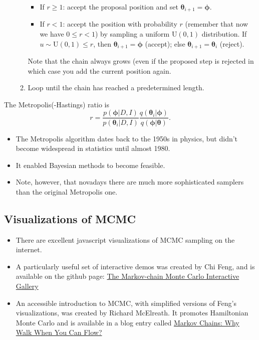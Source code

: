 \documentclass[%
oneside,                 %
final,                   %
10pt]{article}
\begin{document}
\begin{enumerate}
\begin{enumerate}
\begin{itemize}
    \item If $r \geq 1$: accept the proposal position and set $\boldsymbol{\theta}_{i+1} = \boldsymbol{\phi}$.

    \item If $r < 1$: accept the position with probability $r$ (remember that now we have $0 \leq r < 1$) by sampling a uniform $\mathrm{U}(0,1)$ distribution. If $u \sim \mathrm{U}(0,1) \leq r$, then $\boldsymbol{\theta}_{i+1} = \boldsymbol{\phi}$ (accept); else $\boldsymbol{\theta}_{i+1} = \boldsymbol{\theta}_i$ (reject).
\end{itemize}

\noindent
    Note that the chain always grows (even if the proposed step is rejected in which case you add the current position again.

 \item Loop until the chain has reached a predetermined length.
\end{enumerate}

\noindent
\end{enumerate}

\noindent
The Metropolis(-Hastings) ratio is
    \[
    r = \frac{p( \boldsymbol{\phi} | D,I)}{p( \boldsymbol{\theta}_i | D,I)}
    \frac{q( \boldsymbol{\theta}_i | \boldsymbol{\phi} )}{q( \boldsymbol{\phi} | \boldsymbol{\theta} )}.
    \]

\begin{itemize}
\item The Metropolis algorithm dates back to the 1950s in physics, but didn't become widespread in statistics until almost 1980.

\item It enabled Bayesian methods to become feasible.

\item Note, however, that novadays there are much more sophisticated samplers than the original Metropolis one.
\end{itemize}

\noindent
\subsection{Visualizations of MCMC}
\begin{itemize}
\item There are excellent javascript visualizations of MCMC sampling on the internet.

\item A particularly useful set of interactive demos was created by Chi Feng, and is available on the github page: \href{{https://chi-feng.github.io/mcmc-demo/}}{The Markov-chain Monte Carlo Interactive Gallery}

\item An accessible introduction to MCMC, with simplified versions of Feng's visualizations, was created by Richard McElreath. It promotes Hamiltonian Monte Carlo and is available in a blog entry called \href{{http://elevanth.org/blog/2017/11/28/build-a-better-markov-chain/}}{Markov Chains: Why Walk When You Can Flow?} 
\end{itemize}
\end{document}
